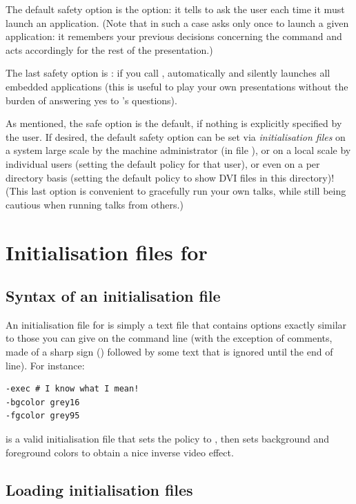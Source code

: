 \documentclass[12pt]{article}
\begin{document}
The default safety option is the  option: it
tells {\ActiveDVI} to ask the user each time it must launch an
application. (Note that in such a case {\ActiveDVI} asks only once to
launch a given application: it remembers your previous decisions
concerning the command and acts accordingly for the rest of the
presentation.)

The last safety option is : if you call 
,  automatically and silently launches all
embedded applications (this is useful to play your own presentations without
the burden of answering yes to {\ActiveDVI}'s questions).

As mentioned, the safe  option is the default, if nothing
is explicitly specified by the user. If desired, the default safety
option can be set via {\em initialisation files} on a system large
scale by the machine administrator (in file ), or
on a local scale by individual users (setting the default policy for
that user), or even on a per directory basis (setting the default
policy to show DVI files in this directory)! (This last option is
convenient to gracefully run your own talks, while still being
cautious when running talks from others.)

\section{Initialisation files for {\ActiveDVI}}

\subsection{Syntax of an initialisation file}

An initialisation file for {\ActiveDVI} is simply a text file that
contains options exactly similar to those you can give on the command
line (with the exception of comments, made of a sharp sign
() followed by some text that is ignored until the end
of line). For instance:
%
\begin{verbatim}
-exec # I know what I mean!
-bgcolor grey16
-fgcolor grey95
\end{verbatim}
is a valid initialisation file that sets the policy to ,
then sets background and foreground colors to obtain a nice inverse
video effect.

\subsection{Loading initialisation files}
\end{document}
